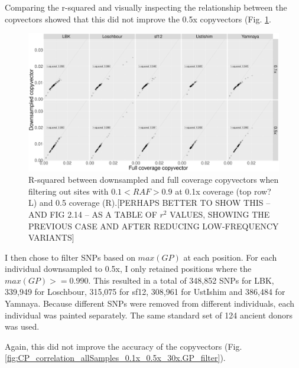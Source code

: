 Comparing the r-squared and visually inspecting the relationship between the copvectors showed that this did not improve the 0.5x copyvectors (Fig.  \ref{fig:CP_correlation_allSamples_0.1x_0.5x_30x.RAF_filter}.


\begin{figure}[htp]
    \centering
    \includegraphics[width=1.0\textwidth]{../images/chapter1/CP_correlation_allSamples_0.1x_0.5x_30x.RAF_filter.png}
    \caption{R-squared between downsampled and full coverage copyvectors when filtering out sites with $0.1 < RAF > 0.9$ at 0.1x coverage ({\color{red}top row?}L) and 0.5 coverage (R).{\color{red}[PERHAPS BETTER TO SHOW THIS -- AND FIG 2.14 -- AS A TABLE OF $r^2$ VALUES, SHOWING THE PREVIOUS CASE AND AFTER REDUCING LOW-FREQUENCY VARIANTS]}}
    \label{fig:CP_correlation_allSamples_0.1x_0.5x_30x.RAF_filter}
\end{figure}
 
I then chose to filter SNPs based on $max(GP)$ at each position. For each individual downsampled to 0.5x, I only retained positions where the $max(GP) >= 0.990$. This resulted in a total of 348,852 SNPs for LBK, 339,949 for Loschbour, 315,075 for sf12, 308,961 for UstIshim and 386,484 for Yamnaya. Because different SNPs were removed from different individuals, each individual was painted separately. The same standard set of 124 ancient donors was used. 

Again, this did not improve the accuracy of the copyvectors (Fig. \ref{fig:CP_correlation_allSamples_0.1x_0.5x_30x.GP_filter}).

